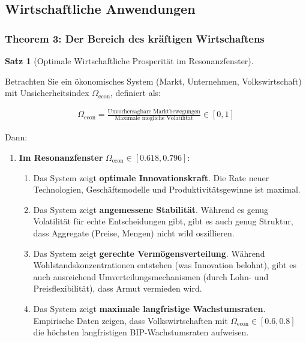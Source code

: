 \documentclass[a4paper,12pt,twoside]{report}
\theoremstyle{definition}
\newtheorem{satz}{Satz}
\begin{document}
\subsection{Wirtschaftliche Anwendungen}

\subsubsection*{Theorem 3: Der Bereich des kräftigen Wirtschaftens}

\begin{satz}[Optimale Wirtschaftliche Prosperität im Resonanzfenster]
\label{satz:economic_flourishing}

Betrachten Sie ein ökonomisches System (Markt, Unternehmen, Volkswirtschaft) mit Unsicherheitsindex $\Omega_{\text{econ}}$, definiert als:

\begin{align}
\Omega_{\text{econ}} = \frac{\text{Unvorhersagbare Marktbewegungen}}{\text{Maximale mögliche Volatilität}} \in [0, 1]
\end{align}

Dann:

\begin{enumerate}
	\item \textbf{Im Resonanzfenster} $\Omega_{\text{econ}} \in [0.618, 0.796]$:
	
	\begin{enumerate}
		\item Das System zeigt \textbf{optimale Innovationskraft}. Die Rate neuer Technologien, Geschäftsmodelle und Produktivitätsgewinne ist maximal.
		
		\item Das System zeigt \textbf{angemessene Stabilität}. Während es genug Volatilität für echte Entscheidungen gibt, gibt es auch genug Struktur, dass Aggregate (Preise, Mengen) nicht wild oszillieren.
		
		\item Das System zeigt \textbf{gerechte Vermögensverteilung}. Während Wohlstandskonzentrationen entstehen (was Innovation belohnt), gibt es auch ausreichend Umverteilungsmechanismen (durch Lohn- und Preisflexibilität), dass Armut vermieden wird.
		
		\item Das System zeigt \textbf{maximale langfristige Wachstumsraten}. Empirische Daten zeigen, dass Volkswirtschaften mit $\Omega_{\text{econ}} \in [0.6, 0.8]$ die höchsten langfristigen BIP-Wachstumsraten aufweisen.
	\end{enumerate}
	

\end{enumerate}
\end{satz}
\end{document}
